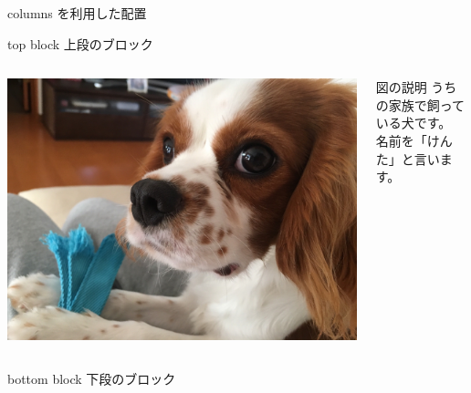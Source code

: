 \documentclass[dvipdfmx, 12pt]{beamer}  %
\begin{document}
\begin{frame}{columns を利用した配置}
  \begin{block}{top block}
    上段のブロック
  \end{block}

  \begin{columns}[c]  %

    \begin{column}{0.3\textwidth}  %
      \includegraphics[width=\columnwidth]{./media/kenta2.jpg}
    \end{column}

    \begin{column}{0.65\textwidth}  %
      \begin{block}{図の説明}
        うちの家族で飼っている犬です。\\
        名前を「けんた」と言います。
      \end{block}
    \end{column}

  \end{columns}

  \begin{block}{bottom block}
    下段のブロック
  \end{block}

\end{frame}

\end{document}
